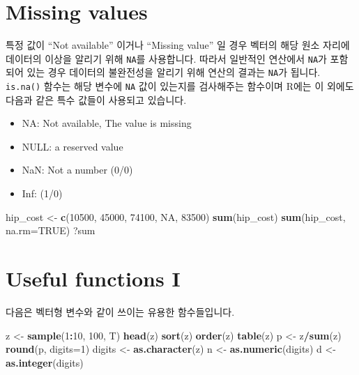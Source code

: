 \documentclass[
]{book}
\newenvironment{Shaded}{\begin{snugshade}}{\end{snugshade}}
\newcommand{\DataTypeTok}[1]{\textcolor[rgb]{0.13,0.29,0.53}{#1}}
\newcommand{\DecValTok}[1]{\textcolor[rgb]{0.00,0.00,0.81}{#1}}
\newcommand{\KeywordTok}[1]{\textcolor[rgb]{0.13,0.29,0.53}{\textbf{#1}}}
\newcommand{\NormalTok}[1]{#1}
\newcommand{\OperatorTok}[1]{\textcolor[rgb]{0.81,0.36,0.00}{\textbf{#1}}}
\newcommand{\OtherTok}[1]{\textcolor[rgb]{0.56,0.35,0.01}{#1}}
\newcommand{\StringTok}[1]{\textcolor[rgb]{0.31,0.60,0.02}{#1}}
\providecommand{\tightlist}{%
  \setlength{\itemsep}{0pt}\setlength{\parskip}{0pt}}
\begin{document}
\hypertarget{missing-values}{%
\section{Missing values}\label{missing-values}}

특정 값이 ``Not available'' 이거나 ``Missing value'' 일 경우 벡터의 해당 원소 자리에 데이터의 이상을 알리기 위해 \texttt{NA}를 사용합니다. 따라서 일반적인 연산에서 \texttt{NA}가 포함되어 있는 경우 데이터의 불완전성을 알리기 위해 연산의 결과는 \texttt{NA}가 됩니다. \texttt{is.na()} 함수는 해당 변수에 \texttt{NA} 값이 있는지를 검사해주는 함수이며 R에는 이 외에도 다음과 같은 특수 값들이 사용되고 있습니다.

\begin{itemize}
\tightlist
\item
  NA: Not available, The value is missing
\item
  NULL: a reserved value
\item
  NaN: Not a number (0/0)
\item
  Inf: (1/0)
\end{itemize}

\begin{Shaded}
\begin{Highlighting}[]
\NormalTok{hip\_cost <{-}}\StringTok{ }\KeywordTok{c}\NormalTok{(}\DecValTok{10500}\NormalTok{, }\DecValTok{45000}\NormalTok{, }\DecValTok{74100}\NormalTok{, }\OtherTok{NA}\NormalTok{, }\DecValTok{83500}\NormalTok{)}
\KeywordTok{sum}\NormalTok{(hip\_cost)}
\KeywordTok{sum}\NormalTok{(hip\_cost, }\DataTypeTok{na.rm=}\OtherTok{TRUE}\NormalTok{)}
\NormalTok{?sum}
\end{Highlighting}
\end{Shaded}

\hypertarget{useful-functions-i}{%
\section{Useful functions I}\label{useful-functions-i}}

다음은 벡터형 변수와 같이 쓰이는 유용한 함수들입니다.

\begin{Shaded}
\begin{Highlighting}[]
\NormalTok{z <{-}}\StringTok{ }\KeywordTok{sample}\NormalTok{(}\DecValTok{1}\OperatorTok{:}\DecValTok{10}\NormalTok{, }\DecValTok{100}\NormalTok{, T)}
\KeywordTok{head}\NormalTok{(z)}
\KeywordTok{sort}\NormalTok{(z)}
\KeywordTok{order}\NormalTok{(z)}
\KeywordTok{table}\NormalTok{(z)}
\NormalTok{p <{-}}\StringTok{ }\NormalTok{z}\OperatorTok{/}\KeywordTok{sum}\NormalTok{(z)}
\KeywordTok{round}\NormalTok{(p, }\DataTypeTok{digits=}\DecValTok{1}\NormalTok{)}
\NormalTok{digits <{-}}\StringTok{ }\KeywordTok{as.character}\NormalTok{(z)}
\NormalTok{n <{-}}\StringTok{ }\KeywordTok{as.numeric}\NormalTok{(digits)}
\NormalTok{d <{-}}\StringTok{ }\KeywordTok{as.integer}\NormalTok{(digits)}
\end{Highlighting}
\end{Shaded}
\end{document}
